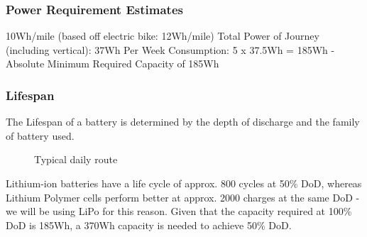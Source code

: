 \documentclass[journal,10pt]{IEEEtran}
\begin{document}
        \subsubsection{Power Requirement Estimates}
            10Wh/mile (based off electric bike: 12Wh/mile)
            Total Power of Journey (including vertical): 37Wh
            Per Week Consumption: 5 x 37.5Wh = 185Wh
            -Absolute Minimum Required Capacity of 185Wh
        \subsubsection{Lifespan}
            The Lifespan of a battery is determined by the depth of discharge and the family of battery used.
            \begin{figure}[H]
                \centering
                \caption{Typical daily route}
                \label{fig:route}
            \end{figure}
            Lithium-ion batteries have a life cycle of approx. 800 cycles at 50\% DoD, whereas Lithium Polymer cells perform better at approx. 2000 charges at the same DoD - we will be using LiPo for this reason. Given that the capacity required at 100\% DoD is 185Wh, a 370Wh capacity is needed to achieve 50\% DoD.
\end{document}
